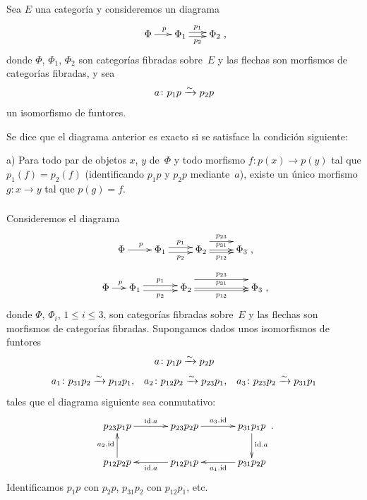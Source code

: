 
\enlargethispage{.5cm}
\skpt
\begingroup
\shorthandoff{<>}%
\setcounter{secnumdepth}{3}
\setcounter{subsubsection}{0}
\renewcommand{\thesubsubsection}{\arabic{section}.\arabic{proposition}.\arabic{subsubsection}}
\begin{definitions}
\label{XIII.1.10}

\subsubsection{}
\label{XIII.1.10.1}
Sea $E$ una categoría y consideremos un diagrama
$$
\xymatrix@C=.6cm{ \Phi \ar[r]^p & \Phi_1 \ar@<2pt>[r]^{p_1}
\ar@<-2pt>[r]_{p_2} & \Phi_2 } \text{,}
$$
donde $\Phi$, $\Phi_1$, $\Phi_2$ son categorías fibradas sobre~$E$ y las
flechas son morfismos de categorías fibradas, y sea
$$
a \colon p_1 p \xrightarrow{\sim} p_2 p
$$
un isomorfismo de funtores.

Se dice que el diagrama anterior es exacto si se satisface la condición
siguiente:

a) Para todo par de objetos $x$, $y$ de~$\Phi$ y todo morfismo $f
\colon p(x) \to p(y)$ tal que $p_1(f) = p_2(f)$ (identificando $p_1p$ y
$p_2p$ mediante~$a$), existe un único morfismo $g \colon x \to y$ tal que
$p(g)=f$.

\subsubsection{}
\label{XIII.1.10.2}
Consideremos el diagrama
{$$
\xymatrix{ \Phi \ar[r]^p & \Phi_1 \ar@<0.6ex>[r]^{p_1}
\ar@<-0.6ex>[r]_{p_2} & \Phi_2 \ar@<2ex>[r]^{p_{23}} \ar[r]^{p_{31}}
\ar@<-0.6ex>[r]_{p_{12}} & \Phi_3 } \text{,}
$$}
{$$
\xymatrix@C=.5cm{ \Phi \ar[r]^p & \Phi_1 \ar@<0.6ex>[rr]^{p_1}
\ar@<-0.6ex>[rr]_{p_2} && \Phi_2 \ar@<2ex>[rrr]^{p_{23}} \ar[rrr]^{p_{31}}
\ar@<-0.6ex>[rrr]_{p_{12}} &&& \Phi_3 } \text{,}
$$}
donde
$\Phi$, $\Phi_i$, $1 \leqslant i \leqslant 3$, son categorías fibradas
sobre~$E$ y las flechas son morfismos de categorías fibradas. Supongamos
dados unos isomorfismos de funtores
$$
a \colon p_1 p \xrightarrow{\sim} p_2 p
$$
$$
a_1 \colon p_{31} p_2 \xrightarrow{\sim} p_{12} p_1 \text{,}\quad a_2 \colon p_{12}
p_2 \xrightarrow{\sim} p_{23} p_1 \text{,}\quad a_3 \colon p_{23} p_2 \xrightarrow{\sim}
p_{31}p_1
$$
tales que el diagrama siguiente sea conmutativo:
$$
\xymatrix@C=1.2cm{ p_{23} p_1 p \ar[r]^{\id.a} & p_{23} p_2 p \ar[r]^{a_3.\id}
& p_{31} p_1 p \ar[d]^{\id.a} \\ p_{12} p_2 p \ar[u]^{a_2.\id} &
p_{12} p_1 p \ar[l]^{\id.a} & p_{31} p_2 p \ar[l]^{a_1.\id} } \text{.}
$$
Identificamos $p_1 p$ con $p_2 p$, $p_{31} p_2$ con $p_{12} p_1$, etc.


\end{definitions}
